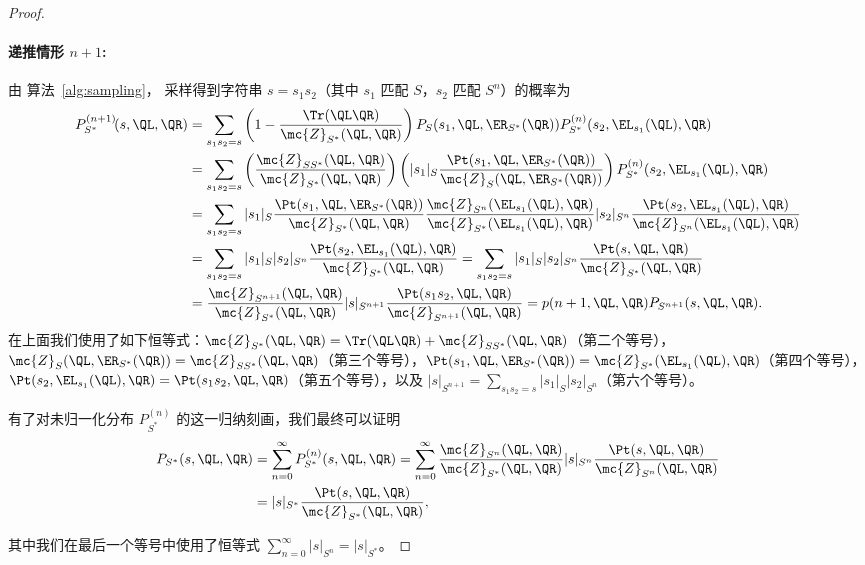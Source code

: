 \begin{proof}
\paragraph{\textbf{递推情形} $n + 1$: } 由 算法~\ref{alg:sampling}，
采样得到字符串 $s = s_1 s_2$（其中 $s_1$ 匹配 $S$，$s_2$ 匹配 $S^{n}$）的概率为
%
\begin{align*}
    P_{S^*}^{(n + 1)}\!(s, \QL, \QR) &= \sum_{s_1 s_2 = s} \left(1 - \frac{\Tr(\QL \QR)}{\mc{Z}_{S^*}(\QL, \QR)} \right) P_{S}(s_1, \QL, \ER_{S^*}(\QR)) P_{S^*}^{(n)}(s_2, \EL_{s_1}(\QL), \QR) \\
    &= \sum_{s_1 s_2 = s} \left(\frac{\mc{Z}_{SS^*}(\QL, \QR)}{\mc{Z}_{S^*}(\QL, \QR)} \right) \left(|s_1|_{S} \frac{\Pt(s_1, \QL, \ER_{S^*}(\QR))}{\mc{Z}_S(\QL, \ER_{S^*}(\QR))}\right) P_{S^*}^{(n)}(s_2, \EL_{s_1}(\QL), \QR) \\
    &= \sum_{s_1 s_2 = s} |s_1|_{S} \frac{\Pt(s_1, \QL, \ER_{S^*}(\QR))}{\mc{Z}_{S^*}(\QL, \QR)} \frac{\mc{Z}_{S^n}(\EL_{s_1}(\QL), \QR)}{\mc{Z}_{S^*}(\EL_{s_1}(\QL), \QR)} |s_2|_{S^n} \frac{\Pt(s_2, \EL_{s_1}(\QL), \QR)}{\mc{Z}_{S^n}(\EL_{s_1}(\QL), \QR)} \\
    &= \sum_{s_1 s_2 = s} |s_1|_{S} |s_2|_{S^n} \frac{\Pt(s_2, \EL_{s_1}(\QL), \QR)}{\mc{Z}_{S^*}(\QL, \QR)} = \sum_{s_1 s_2 = s} |s_1|_{S} |s_2|_{S^n} \frac{\Pt(s, \QL, \QR)}{\mc{Z}_{S^*}(\QL, \QR)} \\
    &= \frac{\mc{Z}_{S^{n+1}}(\QL, \QR)}{\mc{Z}_{S^*}(\QL, \QR)} |s|_{S^{n+1}} \frac{\Pt(s_1 s_2, \QL, \QR)}{\mc{Z}_{S^{n+1}}(\QL, \QR)} = p(n+1, \QL, \QR) P_{S^{n+1}}(s, \QL, \QR). \\
\end{align*}
%
在上面我们使用了如下恒等式：$\mc{Z}_{S^*}(\QL, \QR) = \Tr(\QL \QR) + \mc{Z}_{SS^*}(\QL, \QR)$（第二个等号），$\mc{Z}_S(\QL, \ER_{S^*}(\QR)) = \mc{Z}_{SS^*}(\QL, \QR)$（第三个等号），$\Pt(s_1, \QL, \ER_{S^*}(\QR)) = \mc{Z}_{S^*}(\EL_{s_1}(\QL), \QR)$（第四个等号），$\Pt(s_2, \EL_{s_1}(\QL), \QR) = \Pt(s_1 s_2, \QL, \QR)$（第五个等号），以及 $|s|_{S^{n+1}} = \sum_{s_1 s_2 = s} |s_1|_{S} |s_2|_{S^n}$（第六个等号）。

有了对未归一化分布 $P_{S^*}^{(n)}$ 的这一归纳刻画，我们最终可以证明
%
\begin{align*}
    P_{S^*}(s, \QL, \QR) &= \sum_{n = 0}^\infty P_{S^*}^{(n)}(s, \QL, \QR) = \sum_{n = 0}^\infty \frac{\mc{Z}_{S^{n}}(\QL, \QR)}{\mc{Z}_{S^*}(\QL, \QR)} |s|_{S^{n}} \frac{\Pt(s, \QL, \QR)}{\mc{Z}_{S^{n}}(\QL, \QR)} \\
    &= |s|_{S^*} \frac{\Pt(s, \QL, \QR)}{\mc{Z}_{S^*}(\QL, \QR)},
\end{align*}

其中我们在最后一个等号中使用了恒等式 $\sum_{n = 0}^\infty |s|_{S^{n}} = |s|_{S^*}$。

\end{proof}

